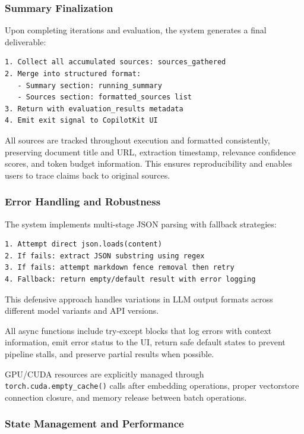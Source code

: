 \subsubsection{Summary Finalization}

Upon completing iterations and evaluation, the system generates a final deliverable:

\begin{lstlisting}
1. Collect all accumulated sources: sources_gathered
2. Merge into structured format:
   - Summary section: running_summary
   - Sources section: formatted_sources list
3. Return with evaluation_results metadata
4. Emit exit signal to CopilotKit UI
\end{lstlisting}

All sources are tracked throughout execution and formatted consistently, preserving document title and URL, extraction timestamp, relevance confidence scores, and token budget information. This ensures reproducibility and enables users to trace claims back to original sources.

\subsubsection{Error Handling and Robustness}

The system implements multi-stage JSON parsing with fallback strategies:

\begin{lstlisting}
1. Attempt direct json.loads(content)
2. If fails: extract JSON substring using regex
3. If fails: attempt markdown fence removal then retry
4. Fallback: return empty/default result with error logging
\end{lstlisting}

This defensive approach handles variations in LLM output formats across different model variants and API versions.

All async functions include try-except blocks that log errors with context information, emit error status to the UI, return safe default states to prevent pipeline stalls, and preserve partial results when possible.

GPU/CUDA resources are explicitly managed through \texttt{torch.cuda.empty\_cache()} calls after embedding operations, proper vectorstore connection closure, and memory release between batch operations.

\subsubsection{State Management and Performance}

